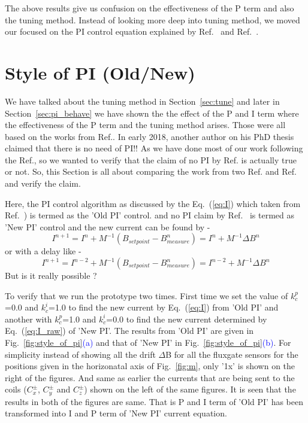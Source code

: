 \FloatBarrier
The above results give us confusion on the effectiveness of the P term and also the tuning method. Instead of looking more deep into tuning method, we moved our focused on the PI control equation explained by Ref.~\cite{bea} and Ref.~\cite{rawlik}.

\section{Style of PI (Old/New)}
We have talked about the tuning method in Section~\ref{sec:tune} and later in Section~\ref{sec:pi_behave} we have shown the the effect of the P and I term where the effectiveness of the P term and the tuning method arises. Those  were all based on the works from Ref.\cite{bea}. In early 2018, another author on his PhD thesis \cite{rawlik} claimed that there is no need of PI!! As we have done most of our work following the Ref.\cite{bea}, so we wanted to verify that the claim of no PI by Ref.\cite{rawlik} is actually true or not. So, this Section is all about comparing the work from two Ref.\cite{bea} and Ref.\cite{rawlik} and verify the claim. 

Here, the PI control algorithm as discussed by the Eq.~(\ref{eq:I}) which taken from Ref.~\cite{bea}) is termed as the 'Old PI' control. and no PI claim by Ref.~\cite{rawlik} is termed as 'New PI' control and the new current can be found by -
\begin{equation}\label{eq:I_raw}
    I^{n+1}= I^n+M^{-1} (B_{setpoint}-B_{measure}^n)=I^n+M^{-1} \Delta B^n
\end{equation}
or with a delay like -
\begin{equation}\label{eq:I_raw_delay}
    I^{n+1}= I^{n-2}+M^{-1} (B_{setpoint}-B_{measure}^n)=I^{n-2}+M^{-1} \Delta B^n
\end{equation}
But is it really possible ? 

To verify that we run the prototype two times. First time we set the value of $k_c^p$=0.0 and $k_c^i$=1.0 to find the new current by Eq.~(\ref{eq:I}) from 'Old PI' and another with $k_c^p$=1.0 and $k_c^i$=0.0 to find the new current determined by Eq.~(\ref{eq:I_raw}) of 'New PI'. The results from 'Old PI' are given in Fig.~\ref{fig:style_of_pi}\textcolor{blue}{(a)} and that of 'New PI' in Fig.~\ref{fig:style_of_pi}\textcolor{blue}{(b)}. For simplicity instead of showing all the drift $\Delta$B for all the fluxgate sensors for the positions given in the horizonatal axis of Fig.~\ref{fig:m}, only '1x' is shown on the right of the figures. And same as earlier the currents  that are being sent to the coils ($C_x^\pm$, $C_y^\pm$ and $C_z^\pm$) shown on the left of the same figures. It is seen that the results in both of the figures are same. That is P and I term of 'Old PI' has been transformed into I and P term of 'New PI' current equation.



